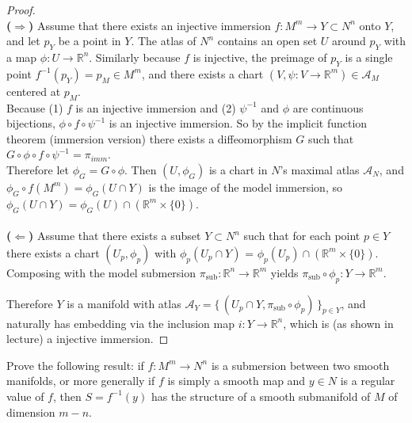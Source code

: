 \documentclass{article}
\newenvironment{problem}[2][Problem]{\begin{trivlist}
\item[\hskip \labelsep {\bfseries #1}\hskip \labelsep {\bfseries #2.}]}{\end{trivlist}}
\begin{document}
\begin{proof} \text{} \\
  \textbf{($\Longrightarrow$)} Assume that there exists an injective immersion
  $f: M^m \rightarrow Y \subset N^n$ onto $Y$, and let $p_Y$ be a point in $Y$.
  The atlas of $N^n$ contains an open set $U$ around $p_Y$ with a map
  $\phi\colon U \rightarrow \mathbb{R}^n$. Similarly because $f$ is injective,
  the preimage of $p_Y$ is a single point $f^{-1}(p_Y) = p_M \in M^m$,
  and there exists a chart
  $(V, \psi\colon V \rightarrow \mathbb{R}^m) \in \mathcal{A}_{M}$ centered at
  $p_M$.\\

  Because (1) $f$ is an injective immersion and (2) $\psi^{-1}$ and $\phi$ are
  continuous bijections,
  $\phi \circ f \circ \psi^{-1}$ is an injective immersion.
  So by the implicit function theorem (immersion version) there exists a
  diffeomorphism $G$ such that $G \circ \phi \circ f \circ \psi^{-1} = \pi_{imm}$.\\

  Therefore let $\phi_G = G \circ \phi$. Then $(U, \phi_G)$ is a chart in $N$'s maximal atlas $\mathcal{A}_N$, and
  $\phi_G \circ f(M^m) = \phi_G(U \cap Y)$ is the image of the model immersion, so
  $\phi_G(U \cap Y) = \phi_G(U) \cap (\mathbb{R}^m \times \{ 0 \})$.
  \\~\\
%
  \textbf{($\Longleftarrow$)} Assume that there exists a subset $Y \subset N^n$
  such that for each point $p \in Y$ there exists a chart $(U_p, \phi_p)$ with
  $\phi_p(U_p\cap Y)$ = $\phi_p(U_p) \cap (\mathbb{R}^m \times \{ 0\})$. Composing
  with the model submersion $\pi_{\text{sub}}: \mathbb{R}^n \rightarrow \mathbb{R}^m$
  yields $\pi_{\text{sub}} \circ \phi_p: Y \rightarrow \mathbb{R}^m$.

  Therefore $Y$ is a manifold with atlas
  $\mathcal{A}_Y = \{\, (U_p \cap Y, \pi_{\text{sub}} \circ \phi_p) \,\}_{p \in Y}$,
  and naturally has embedding via the inclusion map $i\colon Y \rightarrow \mathbb{R}^n$,
  which is (as shown in lecture) a injective immersion.
\end{proof}

\pagebreak

\begin{problem}{4}
  Prove the following result: if $f\colon M^m \rightarrow N^n$ is a submersion
  between two smooth manifolds, or more generally if $f$ is simply a smooth map
  and $y \in N$ is a regular value of $f$, then $S = f^{-1}(y)$ has the
  structure of a smooth submanifold of $M$ of dimension $m - n$.
\end{problem}
\end{document}
